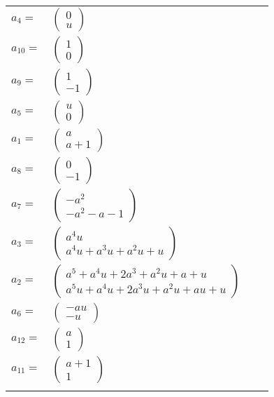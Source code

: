 \documentclass[1p]{elsarticle_modified}
\theoremstyle{definition}
\begin{document}
\begin{tabular}{m{7pt} m{180pt} m{7pt} m{180pt} }
\flushright $a_{4}=$&$\begin{pmatrix}0\\u\end{pmatrix}$ \\
\flushright $a_{10}=$&$\begin{pmatrix}1\\0\end{pmatrix}$ \\
\flushright $a_{9}=$&$\begin{pmatrix}1\\-1\end{pmatrix}$ \\
\flushright $a_{5}=$&$\begin{pmatrix}u\\0\end{pmatrix}$ \\
\flushright $a_{1}=$&$\begin{pmatrix}a\\a+1\end{pmatrix}$ \\
\flushright $a_{8}=$&$\begin{pmatrix}0\\-1\end{pmatrix}$ \\
\flushright $a_{7}=$&$\begin{pmatrix}- a^2\\- a^2- a-1\end{pmatrix}$ \\
\flushright $a_{3}=$&$\begin{pmatrix}a^4 u\\a^4 u+a^3 u+a^2 u+u\end{pmatrix}$ \\
\flushright $a_{2}=$&$\begin{pmatrix}a^5+a^4 u+2 a^3+a^2 u+a+u\\a^5 u+a^4 u+2 a^3 u+a^2 u+a u+u\end{pmatrix}$ \\
\flushright $a_{6}=$&$\begin{pmatrix}- a u\\- u\end{pmatrix}$ \\
\flushright $a_{12}=$&$\begin{pmatrix}a\\1\end{pmatrix}$ \\
\flushright $a_{11}=$&$\begin{pmatrix}a+1\\1\end{pmatrix}$\\&\end{tabular}
\end{document}
